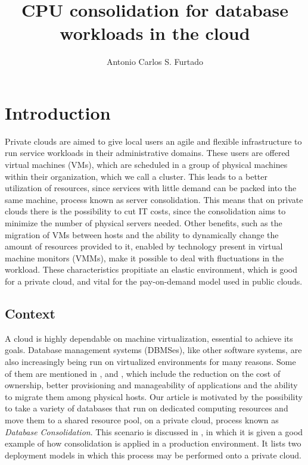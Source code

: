 \documentclass[jidm,a4paper]{jidm} %
\title{CPU consolidation for database workloads in the cloud}
\author{Antonio Carlos S. Furtado}
\institute{Universidade Federal do Parana, Brazil \\ \email{acsfj08@inf.ufpr.br}
}
\begin{document}
\begin{bottomstuff}
\end{bottomstuff}

\maketitle


\section{Introduction}

\label{Introduction}

Private clouds are aimed to give local users an agile and flexible infrastructure to run service workloads in their administrative domains. These users are offered virtual machines (VMs), which are scheduled in a group of physical machines within their organization, which we call a cluster. This leads to a better utilization of resources, since services with little demand can be packed into the same machine, process known as server consolidation. This means that on private clouds there is the possibility to cut IT costs, since the consolidation aims to minimize the number of physical servers needed. Other benefits, such as the migration of VMs between hosts and the ability to dynamically change the 
amount of resources provided to it, enabled by technology present in virtual machine monitors (VMMs), make it 
possible to deal with fluctuations in the workload. These characteristics propitiate an elastic environment, which is good for a private cloud, and vital for the pay-on-demand model used in public clouds.  

\subsection{Context}

A cloud is highly dependable on machine virtualization, essential to achieve its goals. Database management systems (DBMSes), like other software systems, are also increasingly being run on virtualized environments for many reasons. Some of them are mentioned in \cite{4498282}, \cite{4401021} and \cite{Soror:2008:AVM:1376616.1376711}, which include the reduction on the cost of ownership, better provisioning and manageability of applications and the ability to migrate them among physical hosts. Our article is motivated by the possibility to take a variety of databases that run on dedicated computing resources and move them to a shared resource pool, on a private cloud, process known as \textit{Database Consolidation}. This scenario is discussed in \cite{instance1290}, in which it is given a good example of how consolidation is applied in a production environment. It lists two deployment models in which this process may be performed onto a private cloud. 
\end{document}
